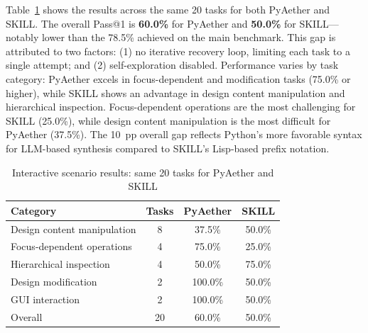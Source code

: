 Table~\ref{tab:interactive-results} shows the results across the same 20 tasks for both PyAether and SKILL. The overall Pass@1 is \textbf{60.0\%} for PyAether and \textbf{50.0\%} for SKILL—notably lower than the 78.5\% achieved on the main benchmark. This gap is attributed to two factors: (1) no iterative recovery loop, limiting each task to a single attempt; and (2) self-exploration disabled. Performance varies by task category: PyAether excels in focus-dependent and modification tasks (75.0\% or higher), while SKILL shows an advantage in design content manipulation and hierarchical inspection. Focus-dependent operations are the most challenging for SKILL (25.0\%), while design content manipulation is the most difficult for PyAether (37.5\%). The 10~pp overall gap reflects Python's more favorable syntax for LLM-based synthesis compared to SKILL's Lisp-based prefix notation.

\begin{table}[htbp]
\centering
\caption{Interactive scenario results: same 20 tasks for PyAether and SKILL}
\label{tab:interactive-results}
\begin{tabular}{lccc}
\toprule
\textbf{Category} & \textbf{Tasks} & \textbf{PyAether} & \textbf{SKILL} \\
\midrule
Design content manipulation & 8 & 37.5\% & 50.0\% \\
Focus-dependent operations & 4 & 75.0\% & 25.0\% \\
Hierarchical inspection & 4 & 50.0\% & 75.0\% \\
Design modification & 2 & 100.0\% & 50.0\% \\
GUI interaction & 2 & 100.0\% & 50.0\% \\
\midrule
Overall & 20 & 60.0\% & 50.0\% \\
\bottomrule
\end{tabular}
\end{table}
